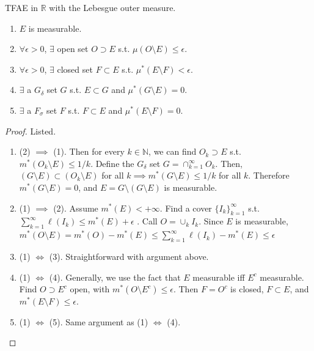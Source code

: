   \begin{theorem}
    TFAE in $\mathbb{R}$ with the Lebesgue outer measure. 
    \begin{enumerate}
      \item $E$ is measurable. 
      \item $\forall \epsilon > 0$, $\exists$ open set $O \supset E$  s.t. $\mu(O \setminus E) \leq \epsilon$. 
      \item $\forall \epsilon > 0$, $\exists$ closed set $F \subset E$ s.t. $\mu^\ast (E \setminus F) < \epsilon$. 
      \item $\exists$ a $G_\delta$ set $G$ s.t. $E \subset G$ and $\mu^\ast (G \setminus E) = 0$. 
      \item $\exists$ a $F_\sigma$ set $F$ s.t. $F \subset E$ and $\mu^\ast (E \setminus F) = 0$. 
    \end{enumerate}
  \end{theorem}
  \begin{proof}
    Listed. 
    \begin{enumerate}
      \item (2) $\implies$ (1). Then for every $k \in \mathbb{N}$, we can find $O_k \supset E$ s.t. $m^\ast (O_k \setminus E) \leq 1/k$. Define the $G_\delta$ set $G = \cap_{k=1}^\infty O_k$. Then, $(G \setminus E) \subset (O_k \setminus E)$ for all $k \implies m^\ast (G \setminus E) \leq 1/k$ for all $k$. Therefore $m^\ast (G \setminus E) = 0$, and $E = G \setminus (G \setminus E)$ is measurable. 

      \item (1) $\implies$ (2). Assume $m^\ast (E) < +\infty$. Find a cover $\{I_k \}_{k=1}^\infty$ s.t. $\sum_{k=1}^\infty \ell (I_k) \leq m^\ast (E) + \epsilon$ . Call $O = \cup_k I_k$. Since $E$ is measurable, $m^\ast (O \setminus E) = m^\ast (O) - m^\ast (E) \leq \sum_{k=1}^\infty \ell(I_k) - m^\ast (E) \leq \epsilon$ 

      \item (1) $\iff$ (3). Straightforward with argument above.  

      \item (1) $\iff$ (4). Generally, we use the fact that $E$ measurable iff $E^c$ measurable. Find $O \supset E^c$ open, with $m^\ast (O \setminus E^c) \leq \epsilon$. Then $F = O^c$ is closed, $F \subset E$, and $m^\ast (E \setminus F) \leq \epsilon$. 

      \item (1) $\iff$ (5). Same argument as (1) $\iff$ (4). 
    \end{enumerate}
  \end{proof}

